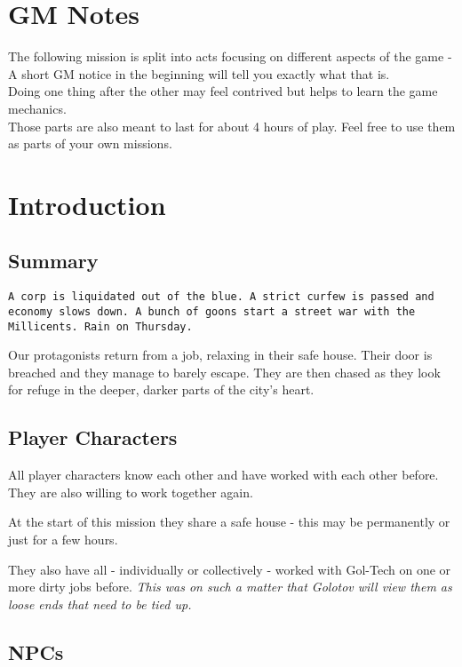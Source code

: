 \documentclass[12pt,a4paper,openany]{book}
\begin{document}
	
	
	\chapter{GM Notes}
		The following mission is split into acts focusing on different aspects of the game -
		A short GM notice in the beginning will tell you exactly what that is.
		\\
		Doing one thing after the other may feel contrived but helps to learn the game mechanics.
		\\
		Those parts are also meant to last for about 4 hours of play. Feel free to use them as parts of your own missions.
	
	\chapter{Introduction}
	\section{Summary}
		\texttt{A corp is liquidated out of the blue. A strict curfew is passed and economy slows down. A bunch of goons start a street war with the Millicents. Rain on Thursday.}
		\par
		Our protagonists return from a job, relaxing in their safe house. Their door is breached and they manage to barely escape. They are then chased as they look for refuge in the deeper, darker parts of the city's heart.
		\par
		
	\section{Player Characters}
		All player characters know each other and have worked with each other before. They are also willing to work together again.
		\par
		At the start of this mission they share a safe house - this may be permanently or just for a few hours.
		\par
		They also have all - individually or collectively - worked with Gol-Tech on one or more dirty jobs before. \emph{This was on such a matter that Golotov will view them as loose ends that need to be tied up.}
	
	\section{NPCs}
\end{document}
